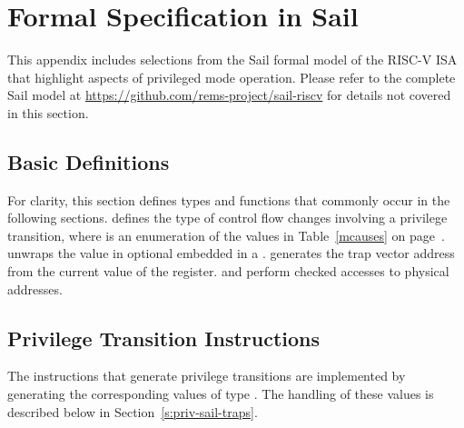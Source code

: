 \chapter{Formal Specification in Sail}
\label{chap:priv-sail-model}


This appendix includes selections from the Sail formal model of the
RISC-V ISA that highlight aspects of privileged mode operation.
Please refer to the complete Sail model at
\url{https://github.com/rems-project/sail-riscv} for details not
covered in this section.

\section{Basic Definitions}
\label{s:priv-sail-basic-defs}

For clarity, this section defines types and functions that commonly
occur in the following sections.   defines the
type of control flow changes involving a privilege transition, where
 is an enumeration of the values in
Table~\ref{mcauses} on page~\pageref{mcauses}. 
unwraps the value in optional  embedded in a
.   generates the
trap vector address from the current value of the 
register.   and
 perform checked accesses to physical
addresses.

\begin{formalspec}
  \sailfnprivLevelToBits
  \sailtypesyncException
  \sailtypectlResult
  \sailfntval
  \sailfntvecAddr
  \sailfnpcAlignmentMask
  \sailfncheckedMemRead
  \sailfncheckedMemWrite
\end{formalspec}

\section{Privilege Transition Instructions}
\label{s:priv-sail-instrs}

The instructions that generate privilege transitions are implemented
by generating the corresponding values of type
.  The handling of these values is described
below in Section~\ref{s:priv-sail-traps}.

\begin{formalspec}
  \sailfclECALLexecute
  \sailfclSRETexecute
  \sailfclMRETexecute
\end{formalspec}


